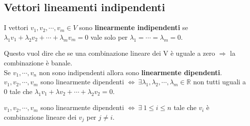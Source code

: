\newpage
\subsection{Vettori lineamenti indipendenti}
\begin{definition}
I vettori $v_1, v_2, \cdots, v_m \in V$ sono \textbf{linearmente indipendenti} se $\lambda_1 v_1 + \lambda_2 v_2 + \cdots + \lambda_m v_m = 0$ vale solo per $\lambda_1 = \cdots = \lambda_m = 0$.
\end{definition}
\hspace{-15pt}Questo vuol dire che se una combinazione lineare dei V è uguale a zero $\Longrightarrow$ la combinazione è banale.\\
Se $v_1, \cdots, v_n$ non sono indipendenti allora sono \textbf{linearmente dipendenti}.\\
$v_1, v_2, \cdots, v_m$ sono linearmente dipendenti $\Longleftrightarrow \: \exists \lambda_1, \lambda_2, \cdots, \lambda_m \in \mathbb{R}$ non tutti uguali a 0 tale che $\lambda_1 v_1 + \lambda v_2 + \cdots + \lambda_2 v_2 = 0$.

\begin{proposition}
$v_1, v_2, \cdots, v_m$ sono linearmente dipendenti $\Longleftrightarrow \: \exists \: 1 \leq i \leq n$ tale che $v_i$ è combinazione lineare dei $v_j$ per $j\neq i$.
\end{proposition}

